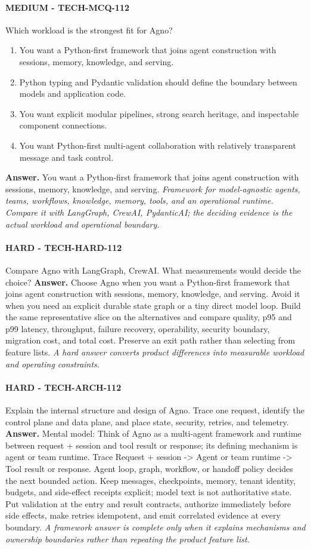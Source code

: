 \paragraph{MEDIUM - TECH-MCQ-112} Which workload is the strongest fit for Agno?
\begin{enumerate}[label=\Alph*.]
\item You want a Python-first framework that joins agent construction with sessions, memory, knowledge, and serving.
\item Python typing and Pydantic validation should define the boundary between models and application code.
\item You want explicit modular pipelines, strong search heritage, and inspectable component connections.
\item You want Python-first multi-agent collaboration with relatively transparent message and task control.
\end{enumerate}
\textbf{Answer.} You want a Python-first framework that joins agent construction with sessions, memory, knowledge, and serving.
\textit{Framework for model-agnostic agents, teams, workflows, knowledge, memory, tools, and an operational runtime. Compare it with LangGraph, CrewAI, PydanticAI; the deciding evidence is the actual workload and operational boundary.}
\paragraph{HARD - TECH-HARD-112} Compare Agno with LangGraph, CrewAI. What measurements would decide the choice?
\textbf{Answer.} Choose Agno when you want a Python-first framework that joins agent construction with sessions, memory, knowledge, and serving. Avoid it when you need an explicit durable state graph or a tiny direct model loop. Build the same representative slice on the alternatives and compare quality, p95 and p99 latency, throughput, failure recovery, operability, security boundary, migration cost, and total cost. Preserve an exit path rather than selecting from feature lists.
\textit{A hard answer converts product differences into measurable workload and operating constraints.}
\paragraph{HARD - TECH-ARCH-112} Explain the internal structure and design of Agno. Trace one request, identify the control plane and data plane, and place state, security, retries, and telemetry.
\textbf{Answer.} Mental model: Think of Agno as a multi-agent framework and runtime between request + session and tool result or response; its defining mechanism is agent or team runtime. Trace Request + session -> Agent or team runtime -> Tool result or response. Agent loop, graph, workflow, or handoff policy decides the next bounded action. Keep messages, checkpoints, memory, tenant identity, budgets, and side-effect receipts explicit; model text is not authoritative state. Put validation at the entry and result contracts, authorize immediately before side effects, make retries idempotent, and emit correlated evidence at every boundary.
\textit{A framework answer is complete only when it explains mechanisms and ownership boundaries rather than repeating the product feature list.}
